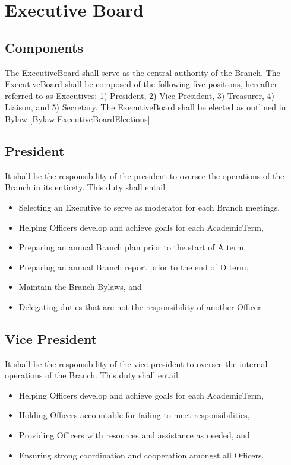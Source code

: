 \chapter{Executive Board}\label{Bylaw:ExecutiveBoard}

\section{Components}\label{Bylaw:ExecutiveBoard:Components}
	The \gls{ExecutiveBoard} shall serve as the central authority of the \gls{Branch}. The \gls{ExecutiveBoard} shall be composed of the following five positions, hereafter referred to as \glspl{Executive}: 1) President, 2) Vice President, 3) Treasurer, 4) Liaison, and 5) Secretary. The \gls{ExecutiveBoard} shall be elected as outlined in \Gls{Bylaw} \ref{Bylaw:ExecutiveBoardElections}. 

\section{President}\label{Bylaw:ExectiveBoard:President}
	It shall be the responsibility of the president to oversee the operations of the \gls{Branch} in its entirety. This duty shall entail
	\begin{itemize}
		\item{Selecting an \gls{Executive} to serve as moderator for each \gls{Branch} meetings,}
		\item{Helping \glspl{Officer} develop and achieve goals for each \gls{AcademicTerm},}
		\item{Preparing an annual \gls{Branch} plan prior to the start of A term,}
		\item{Preparing an annual \gls{Branch} report prior to the end of D term,}
		\item{Maintain the \gls{Branch} \Glspl{Bylaw}, and}
		\item{Delegating duties that are not the responsibility of another \gls{Officer}.}
	\end{itemize}

\section{Vice President}\label{Bylaw:ExectiveBoard:VicePresident}
	It shall be the responsibility of the vice president to oversee the internal operations of the \gls{Branch}. This duty shall entail
	\begin{itemize}
		\item{Helping \glspl{Officer} develop and achieve goals for each \gls{AcademicTerm},}
		\item{Holding \glspl{Officer} accountable for failing to meet responsibilities,}
		\item{Providing \glspl{Officer} with resources and assistance as needed, and}
		\item{Ensuring strong coordination and cooperation amongst all \glspl{Officer}.}
	\end{itemize}

